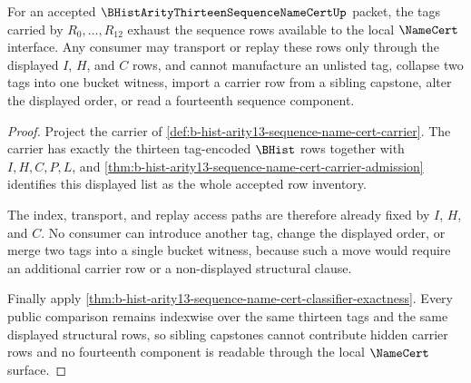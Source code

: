 \begin{theorem}
\label{thm:b-hist-arity13-sequence-name-cert-tag-exhaustion}
For an accepted $\BHistArityThirteenSequenceNameCertUp$ packet, the tags carried by $R_0,\ldots,R_{12}$ exhaust the sequence rows available to the local $\NameCert$ interface. Any consumer may transport or replay these rows only through the displayed $I$, $H$, and $C$ rows, and cannot manufacture an unlisted tag, collapse two tags into one bucket witness, import a carrier row from a sibling capstone, alter the displayed order, or read a fourteenth sequence component.
\end{theorem}
\begin{proof}
Project the carrier of \autoref{def:b-hist-arity13-sequence-name-cert-carrier}. The carrier has exactly the thirteen tag-encoded $\BHist$ rows together with $I,H,C,P,L$, and \autoref{thm:b-hist-arity13-sequence-name-cert-carrier-admission} identifies this displayed list as the whole accepted row inventory.

The index, transport, and replay access paths are therefore already fixed by $I$, $H$, and $C$. No consumer can introduce another tag, change the displayed order, or merge two tags into a single bucket witness, because such a move would require an additional carrier row or a non-displayed structural clause.

Finally apply \autoref{thm:b-hist-arity13-sequence-name-cert-classifier-exactness}. Every public comparison remains indexwise over the same thirteen tags and the same displayed structural rows, so sibling capstones cannot contribute hidden carrier rows and no fourteenth component is readable through the local $\NameCert$ surface.
\end{proof}


